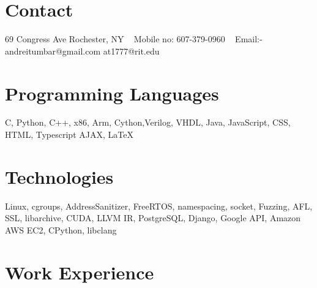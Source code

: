 \documentclass[print]{cv-style}          %
\begin{document}


\begin{aside}
%
\section{Contact}
69 Congress Ave 
Rochester, NY
~
Mobile no:
607-379-0960
~
Email:-
andreitumbar@gmail.com
at1777@rit.edu
%
%
\section{Programming
   Languages}
C, Python, C++,
x86, Arm,
Cython,Verilog,
VHDL, Java, JavaScript,
CSS, HTML, Typescript
AJAX, \LaTeX{}
%
%
\section{Technologies}
Linux, cgroups,
AddressSanitizer,
FreeRTOS,
namespacing, socket,
Fuzzing, AFL,
SSL, libarchive,
CUDA, LLVM IR,
PostgreSQL, Django,
Google API,
Amazon AWS EC2,
CPython, libclang
%
\end{aside}



\section{Work Experience}
\end{document}
